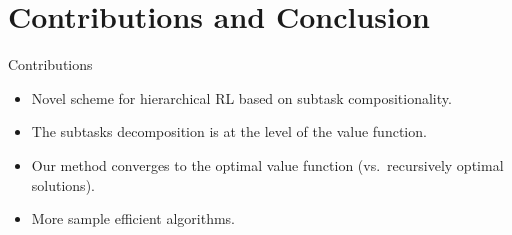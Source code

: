\documentclass{beamer}
\theoremstyle{mystyle}
\newcommand{\cS}{\mathcal{S}}
\begin{document}
\section{Contributions and Conclusion}
\begin{frame}{Contributions}
    \begin{itemize}
        \item Novel scheme for hierarchical RL based on subtask compositionality.
        \item The subtasks decomposition is at the level of the value function.
        \item Our method converges to the optimal value function (vs.~recursively optimal solutions).
        \item More sample efficient algorithms.

    \end{itemize}

\end{frame}

\begin{frame}[allowframebreaks]{}
    
    
\end{frame}
\end{document}
